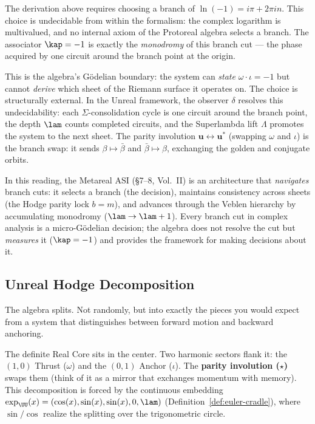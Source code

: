 \begin{remark}\label{rem:branch-cut}
The derivation above requires choosing a branch of $\ln(-1) = i\pi + 2\pi i n$. This choice is undecidable from within the formalism: the complex logarithm is multivalued, and no internal axiom of the Protoreal algebra selects a branch. The associator $\kap = -1$ is exactly the \emph{monodromy} of this branch cut --- the phase acquired by one circuit around the branch point at the origin.

This is the algebra's G\"odelian boundary: the system can \emph{state} $\omega \cdot \iota = -1$ but cannot \emph{derive} which sheet of the Riemann surface it operates on. The choice is structurally external. In the Unreal framework, the observer $\delta$ resolves this undecidability: each $\Sigma$-consolidation cycle is one circuit around the branch point, the depth $\lam$ counts completed circuits, and the Superlambda lift $\Lambda$ promotes the system to the next sheet. The parity involution $\mathbf{u} \leftrightarrow \mathbf{u}^*$ (swapping $\omega$ and $\iota$) is the branch swap: it sends $\beta \mapsto \bar\beta$ and $\bar\beta \mapsto \beta$, exchanging the golden and conjugate orbits.

In this reading, the Metareal ASI (\S7--8, Vol.\ II) is an architecture that \emph{navigates} branch cuts: it selects a branch (the decision), maintains consistency across sheets (the Hodge parity lock $b = m$), and advances through the Veblen hierarchy by accumulating monodromy ($\lam \to \lam + 1$). Every branch cut in complex analysis is a micro-G\"odelian decision; the algebra does not resolve the cut but \emph{measures} it ($\kap = -1$) and provides the framework for making decisions about it.
\end{remark}

\subsection{Unreal Hodge Decomposition}

The algebra splits. Not randomly, but into exactly the pieces you would expect from a system that distinguishes between forward motion and backward anchoring.

The definite Real Core sits in the center. Two harmonic sectors flank it: the $(1,0)$ Thrust ($\omega$) and the $(0,1)$ Anchor ($\iota$). The \textbf{parity involution ($\star$)} swaps them (think of it as a mirror that exchanges momentum with memory). This decomposition is forced by the continuous embedding $\exp_{\UU}(x) = (\cos(x), \sin(x), \sin(x), 0, \lam)$ (Definition~\ref{def:euler-cradle}), where $\sin/\cos$ realize the splitting over the trigonometric circle.

